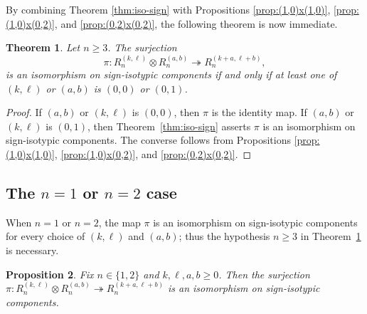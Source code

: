 \documentclass[11pt, reqno]{amsart}
\newtheorem{theorem}{Theorem}[section]
\newtheorem{proposition}[theorem]{Proposition}
\theoremstyle{definition}
\theoremstyle{remark}
\numberwithin{equation}{section}
\newcommand{\0}{\emptyset}
\begin{document}
By combining Theorem \ref{thm:iso-sign} with 
Propositions \ref{prop:(1,0)x(1,0)}, \ref{prop:(1,0)x(0,2)}, and \ref{prop:(0,2)x(0,2)}, 
the following theorem is now immediate.

\begin{theorem}\label{thm:neg-result}
    Let $n \geq 3$.
    The surjection
    \begin{equation*}
        \pi: R_{n}^{(k,\ell)} \otimes R_{n}^{(a,b)} \twoheadrightarrow R_{n}^{(k+a,\ell+b)},
    \end{equation*}
     is an isomorphism on sign-isotypic components if and only if at least one of $(k,\ell)$ or $(a,b)$ is $(0,0)$ or $(0,1)$.
\end{theorem}

\begin{proof}
    If $(a,b)$ or $(k,\ell)$ is $(0,0)$, then $\pi$ is the identity map. 
    If $(a,b)$ or $(k,\ell)$ is $(0,1)$, then Theorem~\ref{thm:iso-sign} asserts $\pi$ is an isomorphism on sign-isotypic components.
    The converse follows from Propositions \ref{prop:(1,0)x(1,0)}, \ref{prop:(1,0)x(0,2)}, and \ref{prop:(0,2)x(0,2)}.
\end{proof}

\subsection{The \texorpdfstring{$n=1$}{n=1} or \texorpdfstring{$n=2$}{n=2} case}\label{subsec:1-or-2}

When $n =1$ or $n=2$, the map $\pi$ is an isomorphism on sign-isotypic components 
for every choice of $(k,\ell)$ and $(a,b)$; 
thus the hypothesis $n \geq 3$ in Theorem~\ref{thm:neg-result} is necessary.

\begin{proposition}\label{prop:small-n-mini}
    Fix $n \in \{1,2\}$ and $k,\ell,a,b \geq 0$.
    Then the surjection $\pi: R_n^{(k,\ell)} \otimes R_n^{(a,b)} \twoheadrightarrow R_n^{(k+a,\ell+b)}$ is an isomorphism on sign-isotypic components.
\end{proposition}
\end{document}
